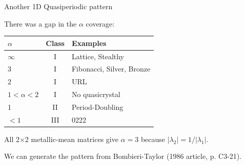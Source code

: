 \documentclass[aspectratio=169, 11pt]{beamer}
\begin{document}
\begin{frame}{Another 1D Quasiperiodic pattern}

There was a gap in the $\alpha$ coverage:

\vspace{0.3em}
\begin{center}
\begin{tabular}{lcl}
\toprule
$\alpha$ & Class & Examples \\
\midrule
$\infty$ & I & Lattice, Stealthy \\
3 & I & Fibonacci, Silver, Bronze \\
2 & I & URL \\
\rowcolor{yellow!30}
$1 < \alpha < 2$ & I & No quasicrystal \\
1 & II & Period-Doubling \\
$< 1$ & III & 0222 \\
\bottomrule
\end{tabular}
\end{center}

\vspace{0.5em}
All 2$\times$2 metallic-mean matrices give $\alpha = 3$ because $|\lambda_2| = 1/|\lambda_1|$.

\vspace{0.3em}
We can generate the pattern from Bombieri-Taylor (1986 article, p. C3-21).
\end{frame}
\end{document}
